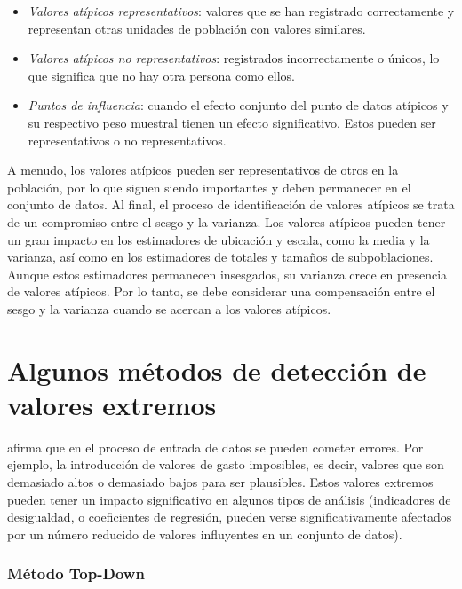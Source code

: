 \documentclass[
  10pt,
  spanish,
]{book}
\providecommand{\tightlist}{%
  \setlength{\itemsep}{0pt}\setlength{\parskip}{0pt}}
\begin{document}
\begin{itemize}
\tightlist
\item
  \emph{Valores atípicos representativos}: valores que se han registrado correctamente y representan otras unidades de población con valores similares.
\item
  \emph{Valores atípicos no representativos}: registrados incorrectamente o únicos, lo que significa que no hay otra persona como ellos.
\item
  \emph{Puntos de influencia}: cuando el efecto conjunto del punto de datos atípicos y su respectivo peso muestral tienen un efecto significativo. Estos pueden ser representativos o no representativos.
\end{itemize}

A menudo, los valores atípicos pueden ser representativos de otros en la población, por lo que siguen siendo importantes y deben permanecer en el conjunto de datos. Al final, el proceso de identificación de valores atípicos se trata de un compromiso entre el sesgo y la varianza. Los valores atípicos pueden tener un gran impacto en los estimadores de ubicación y escala, como la media y la varianza, así como en los estimadores de totales y tamaños de subpoblaciones. Aunque estos estimadores permanecen insesgados, su varianza crece en presencia de valores atípicos. Por lo tanto, se debe considerar una compensación entre el sesgo y la varianza cuando se acercan a los valores atípicos.

\hypertarget{algunos-muxe9todos-de-detecciuxf3n-de-valores-extremos}{%
\section{Algunos métodos de detección de valores extremos}\label{algunos-muxe9todos-de-detecciuxf3n-de-valores-extremos}}

\citet{Filzmoser_Gussenbauer_Templ_2016} afirma que en el proceso de entrada de datos se pueden cometer errores. Por ejemplo, la introducción de valores de gasto imposibles, es decir, valores
que son demasiado altos o demasiado bajos para ser plausibles. Estos valores extremos pueden tener
un impacto significativo en algunos tipos de análisis (indicadores de desigualdad,
o coeficientes de regresión, pueden verse significativamente afectados por un número reducido de
valores influyentes en un conjunto de datos).

\hypertarget{muxe9todo-top-down}{%
\subsubsection*{Método Top-Down}\label{muxe9todo-top-down}}
\end{document}
